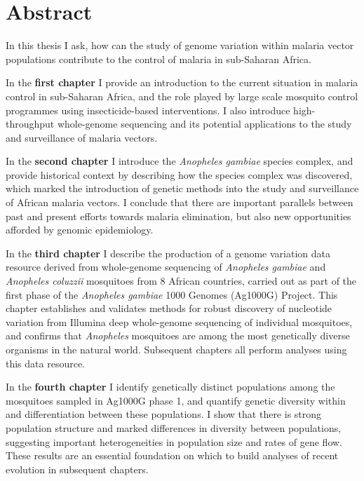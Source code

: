 \chapter*{Abstract}


In this thesis I ask, how can the study of genome variation within malaria vector populations contribute to the control of malaria in sub-Saharan Africa.


In the \textbf{first chapter} I provide an introduction to the current situation in malaria control in sub-Saharan Africa, and the role played by large scale mosquito control programmes using insecticide-based interventions.
%
I also introduce high-throughput whole-genome sequencing and its potential applications to the study and surveillance of malaria vectors.


In the \textbf{second chapter} I introduce the \textit{Anopheles gambiae} species complex, and provide historical context by describing how the species complex was discovered, which marked the introduction of genetic methods into the study and surveillance of African malaria vectors.
%
I conclude that there are important parallels between past and present efforts towards malaria elimination, but also new opportunities afforded by genomic epidemiology.


In the \textbf{third chapter} I describe the production of a genome variation data resource derived from whole-genome sequencing of \textit{Anopheles gambiae} and \textit{Anopheles coluzzii} mosquitoes from 8 African countries, carried out as part of the first phase of the \textit{Anopheles gambiae} 1000 Genomes (Ag1000G) Project.
%
This chapter establishes and validates methods for robust discovery of nucleotide variation from Illumina deep whole-genome sequencing of individual mosquitoes, and confirms that \textit{Anopheles} mosquitoes are among the most genetically diverse organisms in the natural world.
%
Subsequent chapters all perform analyses using this data resource.


In the \textbf{fourth chapter} I identify genetically distinct populations among the mosquitoes sampled in Ag1000G phase 1, and quantify genetic diversity within and differentiation between these populations.
%
I show that there is strong population structure and marked differences in diversity between populations, suggesting important heterogeneities in population size and rates of gene flow.
%
These results are an essential foundation on which to build analyses of recent evolution in subsequent chapters.


